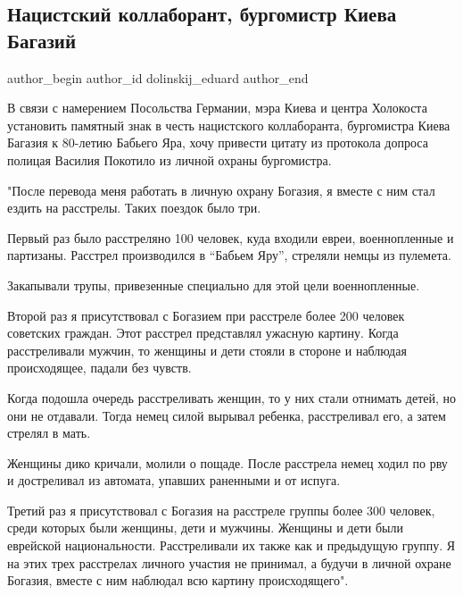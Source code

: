  
 
 
 
 
 
\subsection{Нацистский коллаборант, бургомистр Киева Багазий}
\label{sec:27_09_2021.fb.dolinskij_eduard.1.bogazij_kiev_burgomistr}
 
\ifcmt
 author_begin
   author_id dolinskij_eduard
 author_end
\fi

В связи с намерением Посольства Германии, мэра Киева и центра Холокоста
установить памятный знак в честь нацистского коллаборанта, бургомистра Киева
Багазия к 80-летию Бабьего Яра, хочу привести цитату из протокола допроса
полицая Василия Покотило из личной охраны бургомистра. 

"После перевода меня работать в личную охрану Богазия, я вместе с ним стал
ездить на расстрелы. Таких поездок было три. 

Первый раз было расстреляно 100 человек, куда входили евреи, военнопленные и
партизаны. Расстрел производился в
\enquote{Бабьем Яру}, стреляли немцы из пулемета. 

Закапывали трупы, привезенные специально для этой цели военнопленные.

Второй раз я присутствовал с Богазием при расстреле более 200 человек советских
граждан. Этот расстрел представлял ужасную картину. Когда расстреливали мужчин,
то женщины и дети стояли в стороне и наблюдая происходящее, падали без чувств. 

Когда подошла очередь расстреливать женщин, то у них стали отнимать детей, но
они не отдавали. Тогда немец силой вырывал ребенка, расстреливал его, а затем
стрелял в мать. 

Женщины дико кричали, молили о пощаде. После расстрела немец ходил по рву и
достреливал из автомата, упавших раненными и от испуга.

Третий раз я присутствовал с Богазия на расстреле группы более 300 человек,
среди которых были женщины, дети и мужчины. Женщины и дети были еврейской
национальности. Расстреливали их также как и предыдущую группу. 
Я на этих трех расстрелах личного участия не принимал, а будучи в личной охране
Богазия, вместе с ним наблюдал всю картину происходящего".

